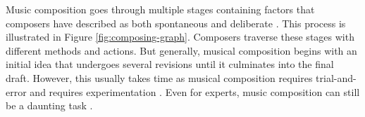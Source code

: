 

Music composition goes through multiple stages containing factors that composers have described as both spontaneous and deliberate \citep{bennett1976process}. This process is illustrated in Figure \ref{fig:composing-graph}. Composers traverse these stages with different methods and actions. But generally, musical composition begins with an initial idea that undergoes several revisions until it culminates into the final draft. However, this usually takes time as musical composition requires trial-and-error and requires experimentation \citep{gartland2003suitability, macdonald2006creativity}. Even for experts, music composition can still be a daunting task \citep{kikuchi2016music}.



